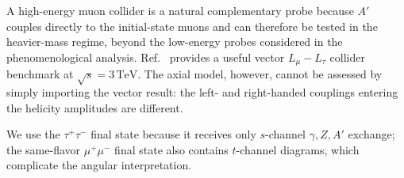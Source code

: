 \documentclass[12pt,a4paper]{article}
\begin{document}
A high-energy muon collider is a natural complementary probe because \(A'\) couples directly to the initial-state muons and can therefore be tested in the heavier-mass regime, beyond the low-energy probes considered in the phenomenological analysis. Ref.~\cite{Huang:2021nkl} provides a useful vector \(L_\mu-L_\tau\) collider benchmark at \(\sqrt{s}=3\,\mathrm{TeV}\). The axial model, however, cannot be assessed by simply importing the vector result: the left- and right-handed couplings entering the helicity amplitudes are different.

We use the \(\tau^+\tau^-\) final state because it receives only \(s\)-channel \(\gamma,Z,A'\) exchange; the same-flavor \(\mu^+\mu^-\) final state also contains \(t\)-channel diagrams, which complicate the angular interpretation.
\end{document}
